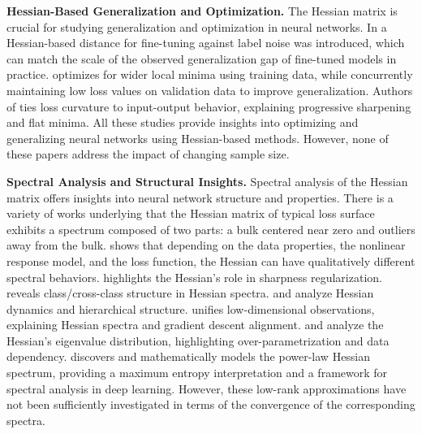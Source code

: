 \documentclass{article}
\begin{document}
\textbf{Hessian-Based Generalization and Optimization.}
The Hessian matrix is crucial for studying generalization and optimization in neural networks. In \cite{ju2023robustfinetuningdeepneural} a Hessian-based distance for fine-tuning against label noise was introduced, which can match the scale of the observed generalization gap of fine-tuned models in practice. \cite{nguyen2024agnosticsharpnessawareminimization} optimizes for wider local minima using training data, while concurrently maintaining low loss values on validation data to improve generalization. Authors of \cite{macdonald2023progressivesharpeningflatminima} ties loss curvature to input-output behavior, explaining progressive sharpening and flat minima. All these studies provide insights into optimizing and generalizing neural networks using Hessian-based methods. However, none of these papers address the impact of changing sample size.

\textbf{Spectral Analysis and Structural Insights.}
Spectral analysis of the Hessian matrix offers insights into neural network structure and properties. There is a variety of works \cite{sagun2018empiricalanalysishessianoverparametrized,pmlr-v97-ghorbani19b,papyan2019spectrumdeepnethessiansscale} underlying that the Hessian matrix of typical loss surface exhibits a spectrum composed of two parts: a bulk centered near zero and outliers away from the bulk. \cite{liao2021hessianeigenspectrarealisticnonlinear} shows that depending on the data properties, the nonlinear response model, and the loss function, the Hessian can have qualitatively different spectral behaviors. \cite{dauphin2024neglectedhessiancomponentexplains} highlights the Hessian's role in sharpness regularization. \cite{papyan2020tracesclasscrossclassstructurepervade} reveals class/cross-class structure in Hessian spectra. \cite{papyan2019spectrumdeepnethessiansscale} and \cite{papyan2019measurementsthreelevelhierarchicalstructure} analyze Hessian dynamics and hierarchical structure. \cite{garrod2024unifyinglowdimensionalobservations} unifies low-dimensional observations, explaining Hessian spectra and gradient descent alignment. \cite{sagun2017eigenvalueshessiandeeplearning} and \cite{sagun2018empiricalanalysishessianoverparametrized} analyze the Hessian's eigenvalue distribution, highlighting over-parametrization and data dependency. \cite{xie2022powerlawhessianspectrumsdeep} discovers and mathematically models the power-law Hessian spectrum, providing a maximum entropy interpretation and a framework for spectral analysis in deep learning. However, these low-rank approximations have not been sufficiently investigated in terms of the convergence of the corresponding spectra.
\end{document}
